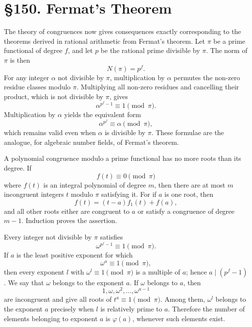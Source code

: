 \documentclass[11pt,a4paper]{book}
\newcommand{\webersection}[2]{\clearpage\section*{\S #1. #2}}
\begin{document}
\webersection{150}{Fermat's Theorem}

The theory of congruences now gives consequences exactly corresponding to the theorems derived in rational arithmetic from Fermat's theorem.  Let \(\pi\) be a prime functional of degree \(f\), and let \(p\) be the rational prime divisible by \(\pi\).  The norm of \(\pi\) is then
\[
 N(\pi)=p^f.
\]
For any integer \(\alpha\) not divisible by \(\pi\), multiplication by \(\alpha\) permutes the non-zero residue classes modulo \(\pi\).  Multiplying all non-zero residues and cancelling their product, which is not divisible by \(\pi\), gives
\begin{equation}
 \alpha^{p^f-1}\equiv 1\pmod{\pi}. \tag{1}
\end{equation}
Multiplication by \(\alpha\) yields the equivalent form
\begin{equation}
 \alpha^{p^f}\equiv \alpha\pmod{\pi}, \tag{2}
\end{equation}
which remains valid even when \(\alpha\) is divisible by \(\pi\).  These formulae are the analogue, for algebraic number fields, of Fermat's theorem.

A polynomial congruence modulo a prime functional has no more roots than its degree.  If
\begin{equation}
 f(t)\equiv 0\pmod{\pi} \tag{3}
\end{equation}
where \(f(t)\) is an integral polynomial of degree \(m\), then there are at most \(m\) incongruent integers \(t\) modulo \(\pi\) satisfying it.  For if \(a\) is one root, then
\[
 f(t)=(t-a)f_1(t)+f(a),
\]
and all other roots either are congruent to \(a\) or satisfy a congruence of degree \(m-1\).  Induction proves the assertion.

Every integer not divisible by \(\pi\) satisfies
\begin{equation}
 \omega^{p^f-1}\equiv 1\pmod{\pi}. \tag{4}
\end{equation}
If \(a\) is the least positive exponent for which
\[
 \omega^a\equiv1\pmod{\pi},
\]
then every exponent \(l\) with \(\omega^l\equiv1\pmod{\pi}\) is a multiple of \(a\); hence \(a\mid(p^f-1)\).  We say that \(\omega\) belongs to the exponent \(a\).  If \(\omega\) belongs to \(a\), then
\[
 1,\omega,\omega^2,
\ldots,\omega^{a-1}
\]
are incongruent and give all roots of \(t^a\equiv1\pmod{\pi}\).  Among them, \(\omega^l\) belongs to the exponent \(a\) precisely when \(l\) is relatively prime to \(a\).  Therefore the number of elements belonging to exponent \(a\) is \(\varphi(a)\), whenever such elements exist.
\end{document}
